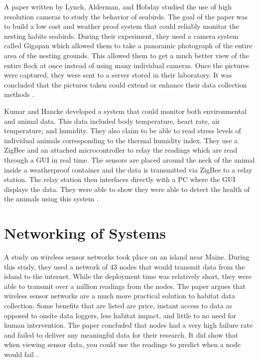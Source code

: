A paper written by Lynch, Alderman, and Hobday studied the use of high resolution cameras to study the behavior of seabirds. The goal of the paper was to build a low cost and weather proof system that could reliably monitor the nesting habits seabirds. During their experiment, they used a camera system called Gigapan which allowed them to take a panoramic photograph of the entire area of the nesting grounds. This allowed them to get a much better view of the entire flock at once instead of using many individual cameras. Once the pictures were captured, they were sent to a server stored in their laboratory. It was concluded that the pictures taken could extend or enhance their data collection methods \cite{lynch_high-resolution_2015}.


Kumar and Hancke developed a system that could monitor both environmental and animal data. This data included body temperature, heart rate, air temperature, and humidity. They also claim to be able to read stress levels of individual animals corresponding to the thermal humidity index. They use a ZigBee and an attached microcontroller to relay the readings which are read through a GUI in real time. The sensors are placed around the neck of the animal inside a weatherproof container and the data is transmitted via ZigBee to a relay station. The relay station then interfaces directly with a PC where the GUI displays the data. They were able to show they were able to detect the health of the animals using this system \cite{kumar_zigbee-based_2015}. 


\section{Networking of Systems}
A study on wireless sensor networks took place on an island near Maine. During this study, they used a network of 43 nodes that would transmit data from the island to the internet. While the deployment time was relatively short, they were able to transmit over a million readings from the nodes. The paper argues that wireless sensor networks are a much more practical solution to habitat data collection. Some benefits that are listed are price, instant access to data as opposed to onsite data loggers, less habitat impact, and little to no need for human intervention. The paper concluded that nodes had a very high failure rate and failed to deliver any meaningful data for their research. It did show that when viewing sensor data, you could use the readings to predict when a node would fail \cite{polastre_analysis_2004}.


